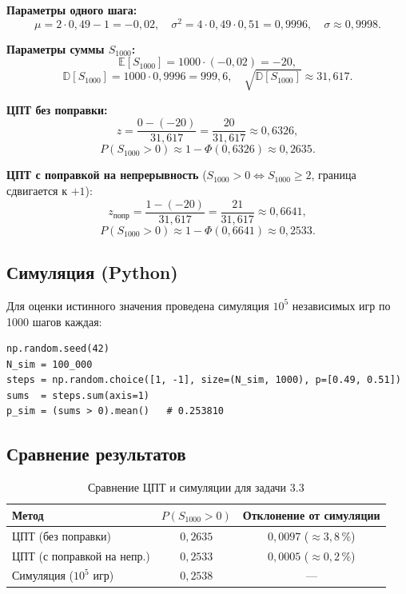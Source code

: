 \documentclass[a4paper,14pt]{article}
\begin{document}
\textbf{Параметры одного шага:}
\[
    \mu = 2 \cdot 0{,}49 - 1 = -0{,}02,
    \quad
    \sigma^2 = 4 \cdot 0{,}49 \cdot 0{,}51 = 0{,}9996,
    \quad
    \sigma \approx 0{,}9998.
\]

\textbf{Параметры суммы $S_{1000}$:}
\[
    \mathbb{E}[S_{1000}] = 1000 \cdot (-0{,}02) = -20,
\]
\[
    \mathbb{D}[S_{1000}] = 1000 \cdot 0{,}9996 = 999{,}6,
    \quad
    \sqrt{\mathbb{D}[S_{1000}]} \approx 31{,}617.
\]

\textbf{ЦПТ без поправки:}
\[
    z = \frac{0 - (-20)}{31{,}617} = \frac{20}{31{,}617} \approx 0{,}6326,
\]
\[
    P(S_{1000} > 0) \approx 1 - \Phi(0{,}6326) \approx 0{,}2635.
\]

\textbf{ЦПТ с поправкой на непрерывность} ($S_{1000} > 0 \Leftrightarrow S_{1000} \geq 2$, граница сдвигается к $+1$):
\[
    z_{\text{попр}} = \frac{1 - (-20)}{31{,}617} = \frac{21}{31{,}617} \approx 0{,}6641,
\]
\[
    P(S_{1000} > 0) \approx 1 - \Phi(0{,}6641) \approx 0{,}2533.
\]

\subsection*{Симуляция (Python)}

Для оценки истинного значения проведена симуляция $10^5$ независимых игр по 1000 шагов каждая:

\begin{verbatim}
np.random.seed(42)
N_sim = 100_000
steps = np.random.choice([1, -1], size=(N_sim, 1000), p=[0.49, 0.51])
sums  = steps.sum(axis=1)
p_sim = (sums > 0).mean()   # 0.253810
\end{verbatim}

\subsection*{Сравнение результатов}

\begin{table}[H]
\centering
\caption{Сравнение ЦПТ и симуляции для задачи 3.3}
\begin{tabular}{|l|c|c|}
\hline
\textbf{Метод} & \textbf{$P(S_{1000}>0)$} & \textbf{Отклонение от симуляции} \\
\hline
ЦПТ (без поправки)          & $0{,}2635$ & $0{,}0097$ ($\approx 3{,}8\,\%$) \\
ЦПТ (с поправкой на непр.)  & $0{,}2533$ & $0{,}0005$ ($\approx 0{,}2\,\%$) \\
Симуляция ($10^5$ игр)       & $0{,}2538$ & — \\
\hline
\end{tabular}
\end{table}
\end{document}
